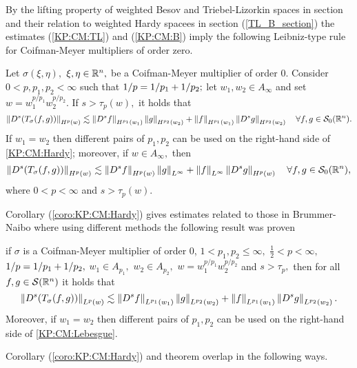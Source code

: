 By the lifting property of weighted Besov and Triebel-Lizorkin spaces in section and their relation to weighted Hardy spacees in section (\ref{TL_B_section}) the estimates (\ref{KP:CM:TL}) and (\ref{KP:CM:B}) imply the following Leibniz-type rule for Coifman-Meyer multipliers of order zero.

\begin{corollary}\label{coro:KP:CM:Hardy}  Let $\sigma(\xi,\eta),$ $\xi,\eta\in{{\mathbb R}^n},$ be a Coifman-Meyer multiplier of order $0.$ 
Consider  $0 < p, p_1, p_2  < \infty$  such that $1/p=1/p_1+1/p_2;$ let  $w_1,w_2\in A_\infty$ and set $w=w_1^{{p}/{p_1}} w_2^{{p}/{p_2}}.$ 
If  $s > \tau_p(w),$ it holds that
\begin{equation}\label{KP:CM:Hardy}
\left\|D^s(T_\sigma(f,g))\right\|_{H^p(w)} \lesssim \left\|D^s f\right\|_{H^{p_1}(w_1)} \left\|g\right\|_{H^{p_2}(w_2)} +  \left\|f\right\|_{H^{p_1}(w_1)}   \left\|D^s g\right\|_{H^{p_2}(w_2)} \quad \forall f, g \in {\mathcal{S}_0}({{\mathbb R}^n}).
\end{equation}
If $w_1=w_2$ then different pairs of $p_1, p_2$ can be used on the right-hand side of \eqref{KP:CM:Hardy}; moreover, if $w\in A_\infty,$ then 
\begin{equation}\label{Kp:CM:Hardy2}
\left\|D^s(T_\sigma(f,g))\right\|_{H^p(w)} \lesssim \left\|D^s f\right\|_{H^{p}(w)} \left\|g\right\|_{L^\infty} +  \left\|f\right\|_{L^\infty}   \left\|D^s g\right\|_{H^{p}(w)} \quad \forall f, g \in {\mathcal{S}_0}({{\mathbb R}^n}),
\end{equation}
where $0<p<\infty$ and $s>\tau_{p}(w).$

\end{corollary}

Corollary (\ref{coro:KP:CM:Hardy}) gives estimates related to those in Brummer-Naibo \citep{BrNa2017} where using different methods the following result was proven
\begin{theorem}\label{BrNa2017_THM}
if $\sigma$ is a Coifman-Meyer multiplier of order 0, $1<p_1,p_2\le \infty,$ $\frac{1}{2}<p<\infty,$ $1/p=1/p_1+1/p_2,$  $w_1\in A_{p_1},$ $w_2\in A_{p_2},$ $w=w_1^{{p}/{p_1}} w_2^{{p}/{p_2}}$ and $s>\tau_p,$ then for all $f,g\in {\mathcal{S}}({{\mathbb R}^n})$ it holds that
\begin{equation}\label{KP:CM:Lebesgue}
\left\|D^s(T_\sigma(f,g))\right\|_{L^p(w)} \lesssim \left\|D^s f\right\|_{L^{p_1}(w_1)} \left\|g\right\|_{L^{p_2}(w_2)} +  \left\|f\right\|_{L^{p_1}(w_1)}   \left\|D^s g\right\|_{L^{p_2}(w_2)}. 
\end{equation}
Moreover, if $w_1=w_2$ then different pairs of $p_1, p_2$ can be used on the right-hand side of \eqref{KP:CM:Lebesgue}.
\end{theorem} 

Corollary (\ref{coro:KP:CM:Hardy}) and theorem \label{BrNa2017_THM} overlap in the following ways. 

